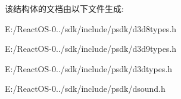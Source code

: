 该结构体的文档由以下文件生成\+:\begin{DoxyCompactItemize}
\item 
E\+:/\+React\+O\+S-\/0../sdk/include/psdk/d3d8types.\+h\item 
E\+:/\+React\+O\+S-\/0../sdk/include/psdk/d3d9types.\+h\item 
E\+:/\+React\+O\+S-\/0../sdk/include/psdk/d3dtypes.\+h\item 
E\+:/\+React\+O\+S-\/0../sdk/include/psdk/dsound.\+h\end{DoxyCompactItemize}
